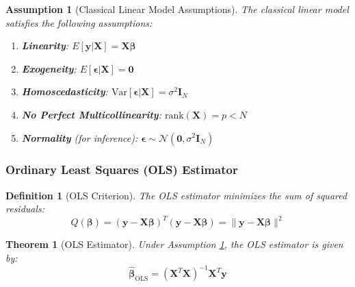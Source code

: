 \documentclass{article}
\newtheorem{definition}{Definition}
\newtheorem{theorem}{Theorem}
\newtheorem{assumption}{Assumption}
\begin{document}
\begin{assumption}[Classical Linear Model Assumptions]
\label{ass:clm}
The classical linear model satisfies the following assumptions:
\begin{enumerate}
    \item \textbf{Linearity}: $E[\mathbf{y}|\mathbf{X}] = \mathbf{X}\boldsymbol{\beta}$
    \item \textbf{Exogeneity}: $E[\boldsymbol{\epsilon}|\mathbf{X}] = \mathbf{0}$
    \item \textbf{Homoscedasticity}: $\text{Var}[\boldsymbol{\epsilon}|\mathbf{X}] = \sigma^2\mathbf{I}_N$
    \item \textbf{No Perfect Multicollinearity}: $\text{rank}(\mathbf{X}) = p < N$
    \item \textbf{Normality} (for inference): $\boldsymbol{\epsilon} \sim \mathcal{N}(\mathbf{0}, \sigma^2\mathbf{I}_N)$
\end{enumerate}
\end{assumption}

\subsubsection{Ordinary Least Squares (OLS) Estimator}

\begin{definition}[OLS Criterion]
The OLS estimator minimizes the sum of squared residuals:
\begin{equation}
Q(\boldsymbol{\beta}) = (\mathbf{y} - \mathbf{X}\boldsymbol{\beta})^T(\mathbf{y} - \mathbf{X}\boldsymbol{\beta}) = \|\mathbf{y} - \mathbf{X}\boldsymbol{\beta}\|^2
\end{equation}
\end{definition}

\begin{theorem}[OLS Estimator]
Under Assumption \ref{ass:clm}, the OLS estimator is given by:
\begin{equation}
\hat{\boldsymbol{\beta}}_{\text{OLS}} = (\mathbf{X}^T\mathbf{X})^{-1}\mathbf{X}^T\mathbf{y}
\end{equation}
\end{theorem}
\end{document}
